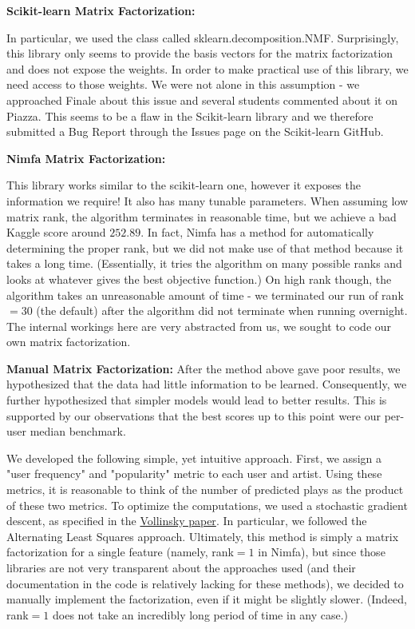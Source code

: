 \documentclass[10pt]{article}
\begin{document}
{\bf Scikit-learn Matrix Factorization:}

In particular, we used the class called sklearn.decomposition.NMF. Surprisingly, this library only seems to provide the basis vectors for the matrix factorization and does not expose the weights. In order to make practical use of this library, we need access to those weights. We were not alone in this assumption - we approached Finale about this issue and several students commented about it on Piazza. This seems to be a flaw in the Scikit-learn library and we therefore submitted a Bug Report through the Issues page on the Scikit-learn GitHub.

{\bf Nimfa Matrix Factorization:}

This library works similar to the scikit-learn one, however it exposes the information we require! It also has many tunable parameters. When assuming low matrix rank, the algorithm terminates in reasonable time, but we achieve a bad Kaggle score around $252.89$.  In fact, Nimfa has a method for automatically determining the proper rank, but we did not make use of that method because it takes a long time. (Essentially, it tries the algorithm on many possible ranks and looks at whatever gives the best objective function.) On high rank though, the algorithm takes an unreasonable amount of time - we terminated our run of rank$=30$ (the default) after the algorithm did not terminate when running overnight. The internal workings here are very abstracted from us, we sought to code our own matrix factorization.

{\bf Manual Matrix Factorization:}
After the method above gave poor results, we hypothesized that the data had little information to be learned. Consequently, we further hypothesized that simpler models would lead to better results. This is supported by our observations that the best scores up to this point were our per-user median benchmark.  

We developed the following simple, yet intuitive approach. First, we assign a "user frequency" and "popularity" metric to each user and artist. Using these metrics, it is reasonable to think of the number of predicted plays as the product of these two metrics. To optimize the computations, we used a stochastic gradient descent, as specified in the \href{https://datajobs.com/data-science-repo/Recommender-Systems-[Netflix].pdf}{Vollinsky paper}. In particular, we followed the Alternating Least Squares approach. Ultimately, this method is simply a matrix factorization for a single feature (namely, rank$=1$ in Nimfa), but since those libraries are not very transparent about the approaches used (and their documentation in the code is relatively lacking for these methods), we decided to manually implement the factorization, even if it might be slightly slower. (Indeed, rank$=1$ does not take an incredibly long period of time in any case.)
\end{document}
